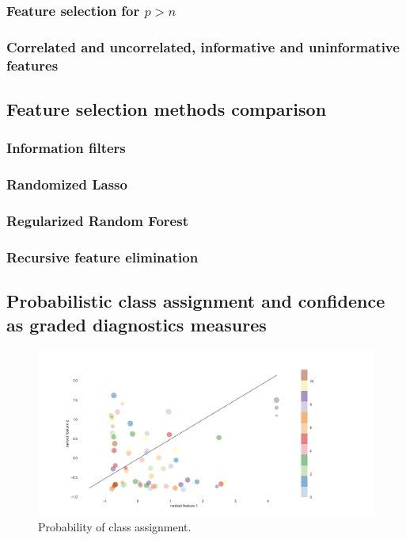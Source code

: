 \documentclass[12pt, a4paper, final, fleqn]{article}
\begin{document}
\subsubsection{Feature selection for $p>n$}
\subsubsection{Correlated and uncorrelated, informative and uninformative features}

\subsection{Feature selection methods comparison}
\subsubsection{Information filters}
\subsubsection{Randomized Lasso}
\subsubsection{Regularized Random Forest}
\subsubsection{Recursive feature elimination}

\subsection{Probabilistic class assignment and confidence as graded diagnostics measures}
\begin{figure}[!htb]
\begin{center}
\includegraphics[width=0.89\columnwidth]{proba_samples_two_features}
  \caption[Probability of class assignment]{Probability of class assignment.
	  \label{fig:probabilistic}}
\end{center}
\end{figure}
\end{document}
